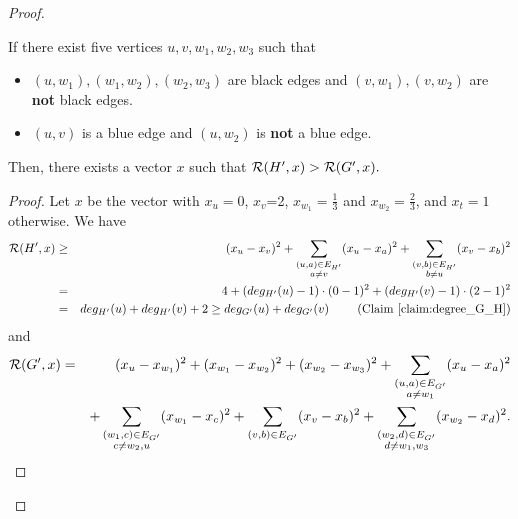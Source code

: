 \begin{proof}
\begin{lemma}\label{lem:w2_degree3}
If there exist five vertices $u,v,w_1,w_2,w_3$ such that 
\begin{itemize}
\item $(u,w_1),(w_1,w_2),(w_2,w_3)$ are black edges and $(v,w_1), (v,w_2)$ are \textbf{not} black edges.
\item $(u,v)$ is a blue edge and $(u,w_2)$ is \textbf{not} a blue edge.
\end{itemize}
Then, there exists a vector $x$ such that ${\cal R}(H',x)> {\cal R}(G',x).$
\end{lemma}
\begin{proof} Let $x$ be the vector with $x_u=0$, $x_v$=2, $x_{w_1}=\frac{1}{3}$ and $x_{w_2}=\frac{2}{3}$, and $x_t=1$ otherwise. 
We have
\begin{eqnarray*}
{\cal R}(H',x)  & \geq & (x_u - x_v)^2 + \sum_{\substack{(u,a) \in E_{H'}\\ a \neq v}} (x_u - x_a)^2 + \sum_{\substack{(v,b)\in E_{H'} \\ b \neq u}} (x_v - x_b)^2\\
& = & 4 + (deg_{H'}(u) - 1)\cdot(0-1)^2  +   (deg_{H'}(v) - 1) \cdot (2-1)^2 \\ 
& = & deg_{H'}(u) + deg_{H'}(v) + 2 \geq deg_{G'}(u) + deg_{G'}(v) \mbox{  \qquad      (Claim~\ref{claim:degree_G_H})}
\end{eqnarray*}
and
\begin{eqnarray*}
{\cal R}(G',x)  & = &  (x_u - x_{w_1})^2 + (x_{w_1} - x_{w_2})^2 + (x_{w_2} - x_{w_3})^2+ \sum_{\substack{(u,a) \in E_{G'}\\ a \neq w_1}} (x_u - x_a)^2 \\
          & &   + \sum_{\substack{(w_1,c) \in E_{G'}  \\ c \neq w_2,u}} (x_{w_1} - x_c)^2 + \sum_{(v,b) \in E_{G'}} (x_v - x_b)^2 + \sum_{\substack{(w_2,d) \in E_{G'}\\ d \neq w_1,w_3}}(x_{w_2} - x_d)^2.
\end{eqnarray*}


\end{proof}
\end{proof}
